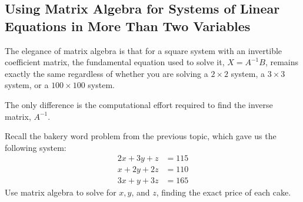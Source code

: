
\subsection{Using Matrix Algebra for Systems of Linear Equations in More Than Two Variables}

The elegance of matrix algebra is that for a square system with an invertible coefficient matrix, the fundamental equation used to solve it, $X = A^{-1}B$, remains exactly the same regardless of whether you are solving a $2 \times 2$ system, a $3 \times 3$ system, or a $100 \times 100$ system. 

The only difference is the computational effort required to find the inverse matrix, $A^{-1}$.

\bigskip

\begin{problem}
Recall the bakery word problem from the previous topic, which gave us the following system:
\begin{align*}
2x + 3y + z &= 115 \\
x + 2y + 2z &= 110 \\
3x + y + 3z &= 165
\end{align*}
Use matrix algebra to solve for $x, y$, and $z$, finding the exact price of each cake.
\end{problem}

